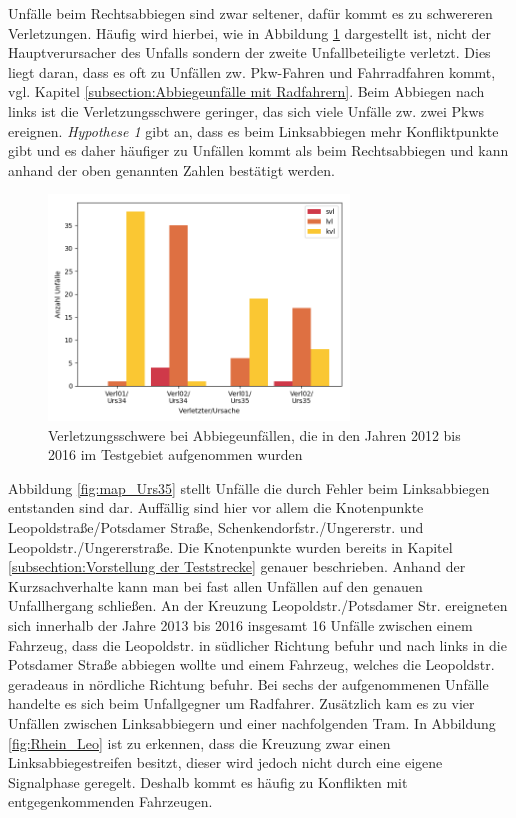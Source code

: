 Unfälle beim Rechtsabbiegen sind zwar seltener, dafür kommt es zu schwereren Verletzungen. Häufig wird hierbei, wie in Abbildung \ref{fig:Abbiegen_Verletzungen} dargestellt ist, nicht der Hauptverursacher des Unfalls sondern der zweite Unfallbeteiligte verletzt. Dies liegt daran, dass es oft zu Unfällen zw. Pkw-Fahren und Fahrradfahren kommt, vgl. Kapitel \ref{subsection:Abbiegeunfälle mit Radfahrern}. Beim Abbiegen nach links ist die Verletzungsschwere geringer, das sich viele Unfälle zw. zwei Pkws ereignen. \textit{Hypothese 1} gibt an, dass es beim Linksabbiegen mehr Konfliktpunkte gibt und es daher häufiger zu Unfällen kommt als beim Rechtsabbiegen und kann anhand der oben genannten Zahlen bestätigt werden.

\begin{savenotes}
	\begin{figure}[H]
		\centering
		\includegraphics[width=8cm,height=6cm]{figures/Abbiegen_Verletzung}
		\caption[Verletzungsschwere der Unfallbeteiligten bei Abbiegeunfällen, die in den Jahren 2012 bis 2016 im Testgebiet aufgenommen wurden]{Verletzungsschwere bei Abbiegeunfällen, die in den Jahren 2012 bis 2016 im Testgebiet aufgenommen wurden}\label{fig:Abbiegen_Verletzungen}
	\end{figure}
\end{savenotes}

Abbildung \ref{fig:map_Urs35} stellt Unfälle die durch Fehler beim Linksabbiegen entstanden sind dar. Auffällig sind hier vor allem die Knotenpunkte Leopoldstraße/Potsdamer Straße, Schenkendorfstr./Ungererstr. und Leopoldstr./Ungererstraße. Die Knotenpunkte wurden bereits in Kapitel \ref{subsechtion:Vorstellung der Teststrecke} genauer beschrieben. Anhand der Kurzsachverhalte kann man bei fast allen Unfällen auf den genauen Unfallhergang schließen. An der Kreuzung Leopoldstr./Potsdamer Str. ereigneten sich innerhalb der Jahre 2013 bis 2016 insgesamt 16 Unfälle zwischen einem Fahrzeug, dass die Leopoldstr. in südlicher Richtung befuhr und nach links in die Potsdamer Straße abbiegen wollte und einem Fahrzeug, welches die Leopoldstr. geradeaus in nördliche Richtung befuhr. Bei sechs der aufgenommenen Unfälle handelte es sich beim Unfallgegner um Radfahrer. Zusätzlich kam es zu vier Unfällen zwischen Linksabbiegern und einer nachfolgenden Tram. In Abbildung \ref{fig:Rhein_Leo} ist zu erkennen, dass die Kreuzung zwar einen Linksabbiegestreifen besitzt, dieser wird jedoch nicht durch eine eigene Signalphase geregelt. Deshalb kommt es häufig zu Konflikten mit entgegenkommenden Fahrzeugen.

